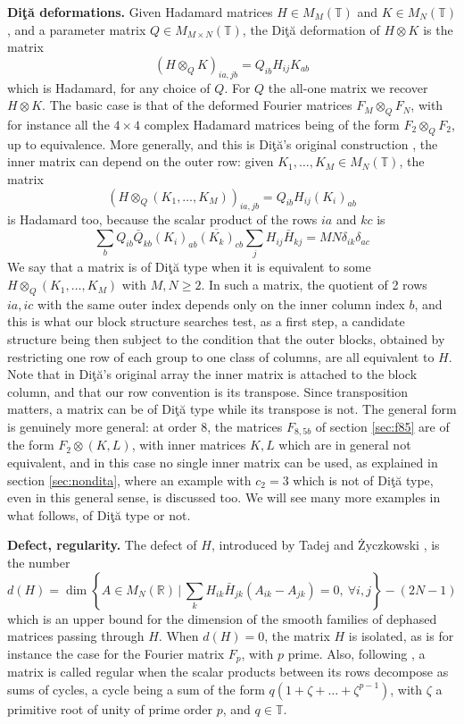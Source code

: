 \documentclass[11pt]{amsart}
\newcommand{\T}{\mathbb T}
\begin{document}
\noindent\textbf{Di\c t\u a deformations.} Given Hadamard matrices $H\in M_M(\T)$ and $K\in M_N(\T)$, and a parameter matrix $Q\in M_{M\times N}(\T)$, the Di\c t\u a deformation of $H\otimes K$ is the matrix \cite{dit}
$$(H\otimes_QK)_{ia,jb}=Q_{ib}H_{ij}K_{ab}$$
which is Hadamard, for any choice of $Q$. For $Q$ the all-one matrix we recover $H\otimes K$. The basic case is that of the deformed Fourier matrices $F_M\otimes_QF_N$, with for instance all the $4\times4$ complex Hadamard matrices being of the form $F_2\otimes_QF_2$, up to equivalence. More generally, and this is Di\c t\u a's original construction \cite{dit}, the inner matrix can depend on the outer row: given $K_1,\ldots,K_M\in M_N(\T)$, the matrix
$$(H\otimes_Q(K_1,\ldots,K_M))_{ia,jb}=Q_{ib}H_{ij}(K_i)_{ab}$$
is Hadamard too, because the scalar product of the rows $ia$ and $kc$ is
$$\sum_bQ_{ib}\bar{Q}_{kb}(K_i)_{ab}\overline{(K_k)}_{cb}\sum_jH_{ij}\bar{H}_{kj}=MN\delta_{ik}\delta_{ac}$$ We say that a matrix is of Di\c t\u a type when it is equivalent to some $H\otimes_Q(K_1,\ldots,K_M)$ with $M,N\geq2$. In such a matrix, the quotient of 2 rows $ia,ic$ with the same outer index depends only on the inner column index $b$, and this is what our block structure searches test, as a first step, a candidate structure being then subject to the condition that the outer blocks, obtained by restricting one row of each group to one class of columns, are all equivalent to $H$. Note that in Di\c t\u a's original array the inner matrix is attached to the block column, and that our row convention is its transpose. Since transposition matters, a matrix can be of Di\c t\u a type while its transpose is not. The general form is genuinely more general: at order 8, the matrices $F_{8,5b}$ of section \ref{sec:f85} are of the form $F_2\otimes(K,L)$, with inner matrices $K,L$ which are in general not equivalent, and in this case no single inner matrix can be used, as explained in section \ref{sec:nondita}, where an example with $c_2=3$ which is not of Di\c t\u a type, even in this general sense, is discussed too. We will see many more examples in what follows, of Di\c t\u a type or not.

\medskip

\noindent\textbf{Defect, regularity.} The defect of $H$, introduced by Tadej and \.Zyczkowski \cite{tz2}, is the number
$$d(H)=\dim\left\{A\in M_N(\mathbb R)\,\Big|\,\sum_kH_{ik}\bar{H}_{jk}(A_{ik}-A_{jk})=0,\ \forall i,j\right\}-(2N-1)$$
which is an upper bound for the dimension of the smooth families of dephased matrices passing through $H$. When $d(H)=0$, the matrix $H$ is isolated, as is for instance the case for the Fourier matrix $F_p$, with $p$ prime. Also, following \cite{gt}, a matrix is called regular when the scalar products between its rows decompose as sums of cycles, a cycle being a sum of the form $q(1+\zeta+\ldots+\zeta^{p-1})$, with $\zeta$ a primitive root of unity of prime order $p$, and $q\in\T$.
\end{document}
